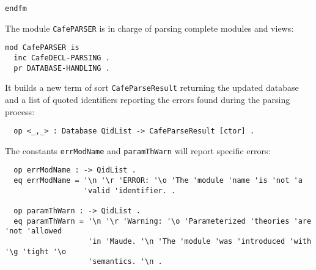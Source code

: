 {\codesize
\begin{verbatim}
endfm
\end{verbatim}
}

The module \verb"CafePARSER" is in charge of parsing complete modules and views:

{\codesize
\begin{verbatim}
mod CafePARSER is
  inc CafeDECL-PARSING .
  pr DATABASE-HANDLING .
\end{verbatim}
}

It builds a new term of sort \verb"CafeParseResult" returning the updated database and
a list of quoted identifiers reporting the errors found during the parsing process:

{\codesize
\begin{verbatim}
  op <_,_> : Database QidList -> CafeParseResult [ctor] .
\end{verbatim}
}


{\codesize
\begin{comment}
  op <_,_> : QidList QidList -> CafeParseResult [ctor] .
\end{comment}
}

{\codesize
\begin{comment}
  vars T T' T'' T1 T2 T3 T4 : Term .
  vars TL PL PL' : TermList .
  var  V : Variable .
  var  C : Constant .
  vars DB DB' : Database .
  vars F Q Q' QI QI' : Qid .
  vars QIL QIL' : QidList .
  vars S S' S'' S''' St St' St'' St''' : String .
  vars CafeM CafeM' : CafeModule .
  var  VDS : OpDeclSet .
  vars PDR PDR' : ParseDeclResult .
  vars PU PU' U U' : Module .
  vars N N' : Nat .
\end{comment}
}

The constants \verb"errModName" and \texttt{paramThWarn} will report specific
errors:

{\codesize
\begin{verbatim}
  op errModName : -> QidList .
  eq errModName = '\n '\r 'ERROR: '\o 'The 'module 'name 'is 'not 'a
                  'valid 'identifier. .

  op paramThWarn : -> QidList .
  eq paramThWarn = '\n '\r 'Warning: '\o 'Parameterized 'theories 'are 'not 'allowed
                   'in 'Maude. '\n 'The 'module 'was 'introduced 'with '\g 'tight '\o
                   'semantics. '\n .
\end{verbatim}
}

